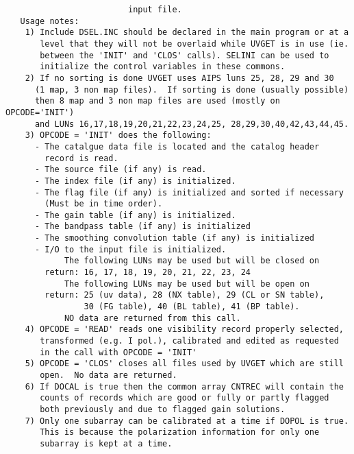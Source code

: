 \begin{verbatim}
                         input file.
   Usage notes:
    1) Include DSEL.INC should be declared in the main program or at a
       level that they will not be overlaid while UVGET is in use (ie.
       between the 'INIT' and 'CLOS' calls). SELINI can be used to
       initialize the control variables in these commons.
    2) If no sorting is done UVGET uses AIPS luns 25, 28, 29 and 30
      (1 map, 3 non map files).  If sorting is done (usually possible)
      then 8 map and 3 non map files are used (mostly on OPCODE='INIT')
      and LUNs 16,17,18,19,20,21,22,23,24,25, 28,29,30,40,42,43,44,45.
    3) OPCODE = 'INIT' does the following:
      - The catalgue data file is located and the catalog header
        record is read.
      - The source file (if any) is read.
      - The index file (if any) is initialized.
      - The flag file (if any) is initialized and sorted if necessary
        (Must be in time order).
      - The gain table (if any) is initialized.
      - The bandpass table (if any) is initialized
      - The smoothing convolution table (if any) is initialized
      - I/O to the input file is initialized.
            The following LUNs may be used but will be closed on
        return: 16, 17, 18, 19, 20, 21, 22, 23, 24
            The following LUNs may be used but will be open on
        return: 25 (uv data), 28 (NX table), 29 (CL or SN table),
                30 (FG table), 40 (BL table), 41 (BP table).
            NO data are returned from this call.
    4) OPCODE = 'READ' reads one visibility record properly selected,
       transformed (e.g. I pol.), calibrated and edited as requested
       in the call with OPCODE = 'INIT'
    5) OPCODE = 'CLOS' closes all files used by UVGET which are still
       open.  No data are returned.
    6) If DOCAL is true then the common array CNTREC will contain the
       counts of records which are good or fully or partly flagged
       both previously and due to flagged gain solutions.
    7) Only one subarray can be calibrated at a time if DOPOL is true.
       This is because the polarization information for only one
       subarray is kept at a time.
\end{verbatim}

